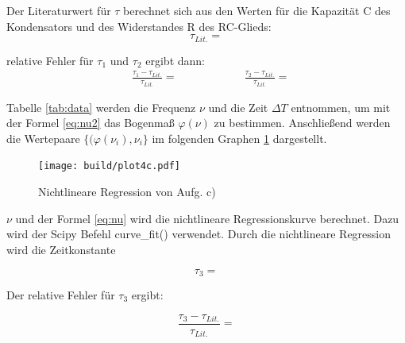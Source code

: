    \justifying  
  Der Literaturwert für $\tau$ berechnet sich aus den Werten für die Kapazität C des Kondensators und 
  des Widerstandes R des RC-Glieds:
  \begin{equation}
  \tau_{Lit.} = \text{} \label{eq:tauL}
  \end{equation}

   \justifying relative Fehler für $\tau_1$ und $\tau_2$ ergibt dann:
  \begin{align}\label{eq:tau1_2}
    &\frac{\tau_1-\tau_{Lit.}}{\tau_{Lit.}}=\phantom{-}\text{} \qquad \qquad
    &\frac{\tau_2-\tau_{Lit.}}{\tau_{Lit.}}=\text{}
  \end{align}


   \justifying Tabelle \ref{tab:data} werden die Frequenz $\nu$ 
  und die Zeit $\Delta T$ entnommen, um mit der Formel \eqref{eq:nu2} das 
  Bogenmaß $\varphi (\nu)$ zu bestimmen. Anschließend werden die Wertepaare $\{(\varphi(\nu_i), 
  \nu_i\}$ im folgenden Graphen \ref{fig:4c} dargestellt.

  \begin{figure}[H]
    \texttt{[image: build/plot4c.pdf]}
    \centering
    \caption{Nichtlineare Regression von Aufg. c)}
    \label{fig:4c}
  \end{figure}

  \newpage
   \justifying $\nu$ und der Formel \eqref{eq:nu} wird die nichtlineare Regressionskurve berechnet. Dazu wird der Scipy Befehl curve\_fit() 
  \cite{scipy} verwendet. Durch die nichtlineare Regression wird die Zeitkonstante
 
  \begin{equation}
  \tau_3 = \text{}
  \end{equation}

   \justifying Der relative Fehler für $\tau_3$ ergibt:

  \begin{equation}
  \frac{\tau_3-\tau_{Lit.}}{\tau_{Lit.}}=\text{}
  \end{equation}


